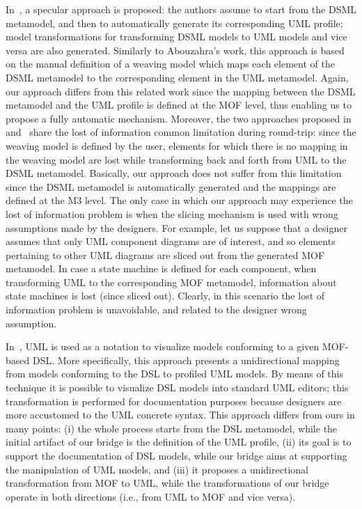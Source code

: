 In~\cite{Wimmer}, a specular approach is proposed: the authors assume to start from the DSML metamodel, and then to automatically
generate its corresponding UML profile; model transformations for transforming DSML models to UML models and vice versa are also generated. Similarly to Abouzahra's work, this approach is based on the manual definition of a weaving model which maps each element of the DSML metamodel to the corresponding element in the UML metamodel. Again, our approach differs from this related work since the mapping between the DSML metamodel and the UML profile is defined at the MOF level, thus enabling us to propose a fully automatic mechanism. Moreover, the two approaches proposed in~\cite{Abouzahra} and~\cite{Wimmer} share the lost of information common limitation during round-trip: since the weaving model is defined by the user, elements for which there is no mapping in the weaving model are lost while transforming back and forth from UML to the DSML metamodel. Basically, our approach does not suffer from this limitation since the DSML metamodel is automatically generated and the mappings are defined at the M3 level. The only case in which our approach may experience the lost of information problem is when the slicing mechanism is used with wrong assumptions made by the designers. For example, let us suppose that a designer assumes that only UML component diagrams are of interest, and so elements pertaining to other UML diagrams are sliced out from the generated MOF metamodel. In case a state machine is defined for each component, when transforming UML to the corresponding MOF metamodel, information about state machines is lost (since sliced out). Clearly, in this scenario the lost of information problem is unavoidable, and related to the designer wrong assumption.

In~\cite{Graaf}, UML is used as a notation to visualize models conforming to a given MOF-based DSL.
More specifically, this approach presents a unidirectional mapping from models conforming to the DSL to profiled UML models.
By means of this technique it is possible to visualize DSL models into standard UML editors;
this transformation is performed for documentation purposes because designers are more accustomed to the UML concrete syntax.
This approach differs from ours in many points: (i) the whole process starts from the DSL metamodel, while the initial artifact of our bridge is the definition of the UML profile, (ii) its goal is to support the documentation of DSL models, while our bridge aims at supporting the manipulation of UML models, and (iii) it proposes a unidirectional transformation from MOF to UML, while the transformations of our bridge operate in both directions (i.e., from UML to MOF and vice versa).

